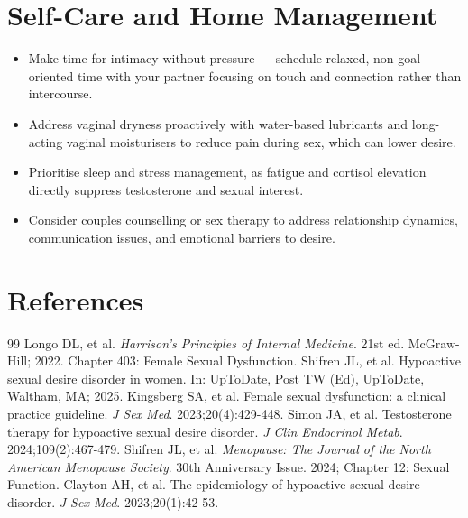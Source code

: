 \section*{Self-Care and Home Management}
\begin{itemize}
  \item Make time for intimacy without pressure — schedule relaxed, non-goal-oriented time with your partner focusing on touch and connection rather than intercourse.
  \item Address vaginal dryness proactively with water-based lubricants and long-acting vaginal moisturisers to reduce pain during sex, which can lower desire.
  \item Prioritise sleep and stress management, as fatigue and cortisol elevation directly suppress testosterone and sexual interest.
  \item Consider couples counselling or sex therapy to address relationship dynamics, communication issues, and emotional barriers to desire.
\end{itemize}

\section*{References}

\begin{thebibliography}{99}
 Longo DL, et al. \emph{Harrison's Principles of Internal Medicine}. 21st ed. McGraw-Hill; 2022. Chapter 403: Female Sexual Dysfunction.
 Shifren JL, et al. Hypoactive sexual desire disorder in women. In: UpToDate, Post TW (Ed), UpToDate, Waltham, MA; 2025.
 Kingsberg SA, et al. Female sexual dysfunction: a clinical practice guideline. \emph{J Sex Med}. 2023;20(4):429-448.
 Simon JA, et al. Testosterone therapy for hypoactive sexual desire disorder. \emph{J Clin Endocrinol Metab}. 2024;109(2):467-479.
 Shifren JL, et al. \emph{Menopause: The Journal of the North American Menopause Society}. 30th Anniversary Issue. 2024; Chapter 12: Sexual Function.
 Clayton AH, et al. The epidemiology of hypoactive sexual desire disorder. \emph{J Sex Med}. 2023;20(1):42-53.
\end{thebibliography}
